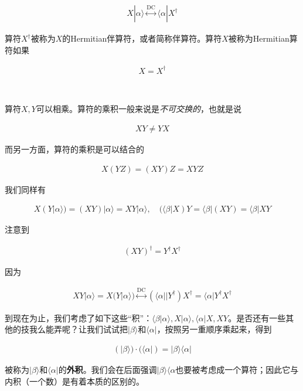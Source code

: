 \documentclass[UTF8,twoside]{ctexart}
\begin{document}
\begin{align}
X|\alpha\rangle\overset{\text{DC}}{\longleftrightarrow}\langle\alpha|X^\dagger
\end{align}

\noindent 算符$X^\dagger$被称为$X$的Hermitian伴算符，或者简称伴算符。算符$X$被称为Hermitian算符如果

\begin{align}
X=X^\dagger
\end{align}

\ 


\noindent 算符$X, Y$可以相乘。算符的乘积一般来说是{\emph{不可交换的}}，也就是说

\begin{align}
XY\neq YX
\end{align}

\noindent 而另一方面，算符的乘积是可以结合的

\begin{align}\label{1.2.27}
X(YZ)=(XY)Z=XYZ
\end{align}

\noindent 我们同样有

\begin{align}
X(Y|\alpha\rangle) = (XY)|\alpha\rangle = XY|\alpha\rangle,\quad (\langle\beta|X)Y=\langle\beta|(XY)=\langle\beta|XY
\end{align}

\noindent 注意到

\begin{align}
(XY)^\dagger=Y^\dagger X^\dagger
\end{align}

\noindent 因为

\begin{align}
XY|\alpha\rangle = X(Y|\alpha\rangle)\overset{\text{DC}}{\longleftrightarrow}(\langle\alpha||Y^\dagger)X^\dagger = \langle\alpha|Y^\dagger X^\dagger
\end{align}

到现在为止，我们考虑了如下这些``积''：$\langle\beta|\alpha\rangle,X|\alpha\rangle,\langle\alpha|X,XY$。是否还有一些其他的技我么能弄呢？让我们试试把$|\beta\rangle$和$\langle\alpha|$，按照另一重顺序乘起来，得到

\begin{align}
(|\beta\rangle)\cdot(\langle\alpha|)=|\beta\rangle\langle\alpha|
\end{align}

\noindent 被称为$|\beta\rangle$和$\langle\alpha|$的{\bf 外积}。我们会在后面强调$|\beta\rangle\langle\alpha$也要被考虑成一个算符；因此它与内积（一个数）是有着本质的区别的。
\end{document}
